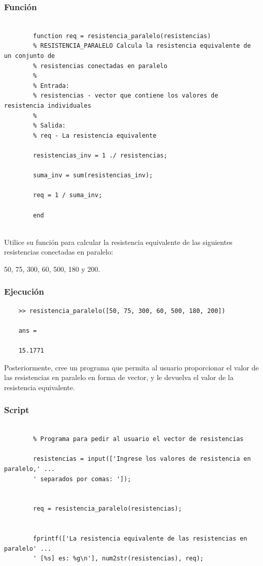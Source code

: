 \documentclass{article}
\begin{document}
	\subsubsection{Función}
	
	\begin{lstlisting}
		
		function req = resistencia_paralelo(resistencias)
		% RESISTENCIA_PARALELO Calcula la resistencia equivalente de un conjunto de
		% resistencias conectadas en paralelo
		%
		% Entrada:
		% resistencias - vector que contiene los valores de resistencia individuales
		%
		% Salida:
		% req - La resistencia equivalente
		
		resistencias_inv = 1 ./ resistencias;
		
		suma_inv = sum(resistencias_inv);
		
		req = 1 / suma_inv;
		
		end
		
	\end{lstlisting}
	
	Utilice su función para calcular la resistencia equivalente de las siguientes resistencias conectadas en paralelo:
	
	50, 75, 300, 60, 500, 180 y 200.
	
	\subsubsection{Ejecución}
	
	\begin{lstlisting}
	>> resistencia_paralelo([50, 75, 300, 60, 500, 180, 200])
	
	ans =
		
	15.1771
	\end{lstlisting}
	
	Posteriormente, cree un programa que permita al usuario proporcionar el valor de las resistencias en paralelo en forma de vector, y le devuelva el valor de la resistencia equivalente.
	
	\subsubsection{Script}
	
	\begin{lstlisting}
		
		% Programa para pedir al usuario el vector de resistencias
		
		resistencias = input(['Ingrese los valores de resistencia en paralelo,' ...
		' separados por comas: ']);
		
		
		req = resistencia_paralelo(resistencias);
		
		
		fprintf(['La resistencia equivalente de las resistencias en paralelo' ...
		' [%s] es: %g\n'], num2str(resistencias), req);
	\end{lstlisting}
	
\end{document}
